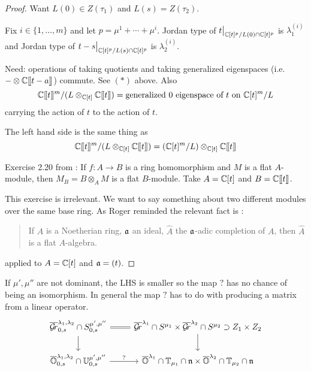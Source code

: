 \documentclass[draft]{article}
\begin{document}
\begin{proof}
    Want $L(0) \in Z(\tau_1)$ and $L(s) = Z(\tau_2)$. 

    Fix $i \in \{1,\dots,m\}$ and let $p = \mu^1 + \cdots + \mu^i$. 
    Jordan type of $t\big|_{\mathbb C[t]^p/L(0)\cap\mathbb C[t]^p}$ is $\lambda_1^{(i)}$ and Jordan type of $t-s\big|_{\mathbb C[t]^p/L(s)\cap \mathbb C[t]^p}$ is $\lambda_2^{(i)}$. 

    Need: operations of taking quotients and taking generalized eigenspaces (i.e.\ $-\otimes\mathbb C[\hspace{-.12em}[ {t-a} ]\hspace{-.12em}]$) commute.
    See $(*)$ above. Also 
    $$\mathbb C[\hspace{-.12em}[ {t} ]\hspace{-.12em}]^m/(L \otimes_{\mathbb C[t]} \mathbb C[\hspace{-.12em}[ {t} ]\hspace{-.12em}]) = \text{generalized $0$ eigenspace of $t$ on } \mathbb C[t]^m/L$$
    carrying the action of $t $ to the action of $t$.
    
    The left hand side is the same thing as
    $$ \mathbb C[\hspace{-.12em}[ {t} ]\hspace{-.12em}]^m / (L \otimes_{\mathbb C[t]} \mathbb C[\hspace{-.12em}[ {t} ]\hspace{-.12em}]) = (\mathbb C[t]^m/L) \otimes_{\mathbb C[t]} \mathbb C[\hspace{-.12em}[ {t} ]\hspace{-.12em}] $$

    Exercise 2.20 from \cite{atiyah2018introduction}: If $f : A \to B$ is a ring homomorphism and $M$ is a flat $A$-module, then $M_B = B\otimes_A M$ is a flat $B$-module. Take $A=\mathbb C[t]$ and $B=\mathbb C[\hspace{-.12em}[ {t} ]\hspace{-.12em}]$. \marginpar[]{*}

    This exercise is irrelevant. We want to say something about two different modules over the same base ring. As Roger reminded the relevant fact is \cite[Proposition~10.14]{atiyah2018introduction}: 
    \begin{quotation}
        If $A$ is a Noetherian ring, $\mathfrak a$ an ideal, $\hat A$ the $\mathfrak a$-adic completion of $A$, then $\hat A$ is a flat $A$-algebra.
    \end{quotation}
    applied to $A = \mathbb C[t]$ and $\mathfrak a = (t)$. 
\end{proof}

\begin{question}
    If $\mu',\mu''$ are not dominant, the LHS is smaller so the map $?$ has no chance of being an isomorphism. In general the map $?$ has to do with producing a matrix from a linear operator. 
    \[
    \begin{tikzcd}
        \overline\Gr^{\lambda_1,\lambda_2}_{0,s}\cap S^{\mu',\mu''}_{0,s} \ar[r,equals]\ar[d] & \overline\Gr^{\lambda_1} \cap S^{\mu_1} \times \overline\Gr^{\lambda_2} \cap S^{\mu_2} \supset Z_1 \times Z_2 \ar[d]\\
        \overline\OO^{\lambda_1,\lambda_2}_{0,s} \cap \UU^{\mu',\mu''}_{0,s} \ar[r,"?"] & \overline\OO^{\lambda_1}\cap \TT_{\mu_1}\cap \n \times \overline\OO^{\lambda_2}\cap \TT_{\mu_2}\cap \n
    \end{tikzcd}    
    \]
\end{question}
\end{document}
